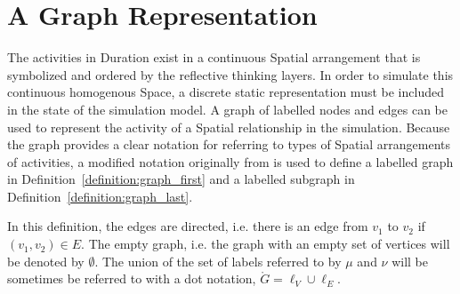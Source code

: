 \section{A Graph Representation}

The activities in Duration exist in a continuous Spatial arrangement
that is symbolized and ordered by the reflective thinking layers.  In
order to simulate this continuous homogenous Space, a discrete static
representation must be included in the state of the simulation model.
A graph of labelled nodes and edges can be used to represent the
activity of a Spatial relationship in the simulation.  Because the
graph provides a clear notation for referring to types of Spatial
arrangements of activities, a modified notation originally from
{\mbox{\cite{messmer:1995}}} is used to define a labelled graph in
{\mbox{Definition~\ref{definition:graph_first}}} and a labelled
subgraph in {\mbox{Definition~\ref{definition:graph_last}}}.

 \noindent In this definition, the edges are
directed, i.e. there is an edge from $v_1$ to $v_2$ if $(v_1,
v_2){\in}E$.  The empty graph, i.e. the graph with an empty set of
vertices will be denoted by $\emptyset$.  The union of the set of
labels referred to by $\mu$ and $\nu$ will be sometimes be referred to
with a dot notation, $\mathring{G}=\ell_V {\cup} \ell_E$.

